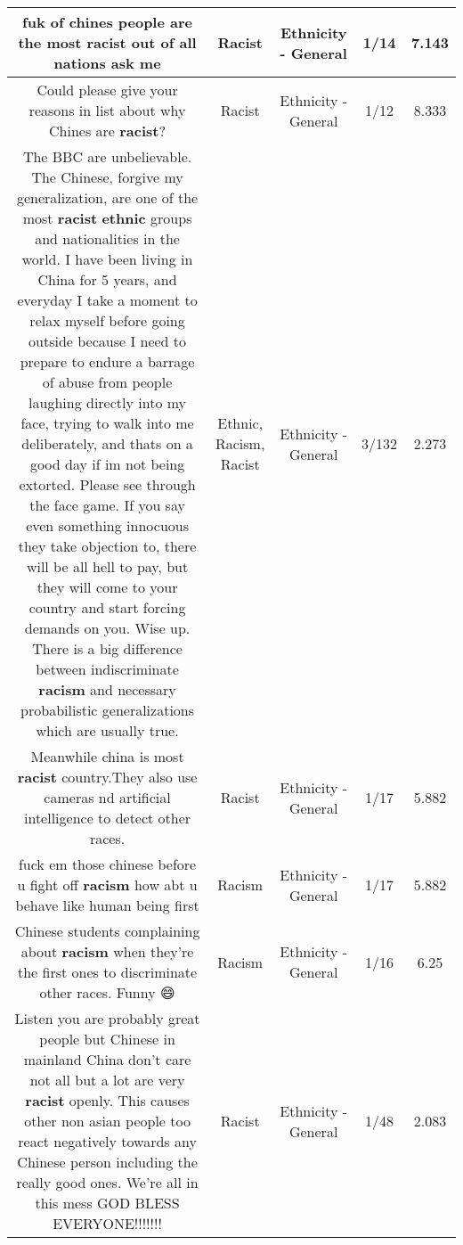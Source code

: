 \documentclass[11pt]{article}
\newlength\mylength
\begin{document}
\begin{center}
\begin{longtable}{|C{.65\mylength}|C{.30\mylength}|C{.12\mylength}|C{.12\mylength}|C{.12\mylength}|}
  \small fuk of chines people are the most \textbf{racist} out of all nations ask me\normalsize   & Racist & Ethnicity - General & 1/14 & 7.143 \\  \hline
  \small Could please give your reasons in list about why Chines are \textbf{racist}?\normalsize   & Racist & Ethnicity - General & 1/12 & 8.333 \\  \hline
  \small The BBC are unbelievable. The Chinese, forgive my generalization, are one of the most \textbf{racist} \textbf{ethnic} groups and nationalities in the world. I have been living in China for 5 years, and everyday I take a moment to relax myself before going outside because I need to prepare to endure a barrage of abuse from people laughing directly into my face, trying to walk into me deliberately, and thats on a good day if im not being extorted. Please see through the face game. If you say even something innocuous they take objection to, there will be all hell to pay, but they will come to your country and start forcing demands on you. Wise up. There is a big difference between indiscriminate \textbf{racism} and necessary probabilistic generalizations which are usually true.\normalsize   & Ethnic, Racism, Racist & Ethnicity - General & 3/132 & 2.273 \\  \hline
  \small Meanwhile china is most \textbf{racist} country.They also use cameras nd artificial intelligence to detect other races.\normalsize   & Racist & Ethnicity - General & 1/17 & 5.882 \\  \hline
  \small fuck em those chinese before u fight off \textbf{racism} how abt u behave like human being first\normalsize   & Racism & Ethnicity - General & 1/17 & 5.882 \\  \hline
  \small Chinese students complaining about \textbf{racism} when they're the first ones to discriminate other races. Funny 😄\normalsize   & Racism & Ethnicity - General & 1/16 & 6.25 \\  \hline
  \small Listen you are probably great people but Chinese in mainland China don't care not all but a lot are very \textbf{racist} openly.  This causes other non asian people too react negatively towards any Chinese person including the really good ones. We're all in this mess GOD BLESS EVERYONE!!!!!!!\normalsize   & Racist & Ethnicity - General & 1/48 & 2.083 \\  \hline

\end{longtable}
\end{center}
\end{document}
